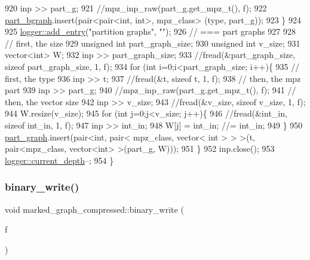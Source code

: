 \begin{DoxyCode}
920     inp >> part\_g;
921     \textcolor{comment}{//mpz\_inp\_raw(part\_g.get\_mpz\_t(), f);}
922     \hyperlink{classmarked__graph__compressed_a7b3267063fba30b45eb21b3ba4e07536}{part\_bgraph}.insert(pair<pair<int, int>, mpz\_class> (type, part\_g));
923   \}
924 
925   \hyperlink{classlogger_a710163deb17bc81f70d53d285b8ac9ac}{logger::add\_entry}(\textcolor{stringliteral}{"partition graphs"}, \textcolor{stringliteral}{""});
926   \textcolor{comment}{// === part graphs}
927 
928   \textcolor{comment}{// first, the size}
929   \textcolor{keywordtype}{unsigned} \textcolor{keywordtype}{int} part\_graph\_size;
930   \textcolor{keywordtype}{unsigned} \textcolor{keywordtype}{int} v\_size;
931   vector<int> W; 
932   inp >> part\_graph\_size;
933   \textcolor{comment}{//fread(&part\_graph\_size, sizeof part\_graph\_size, 1, f);}
934   \textcolor{keywordflow}{for} (\textcolor{keywordtype}{int} i=0;i<part\_graph\_size; i++)\{
935     \textcolor{comment}{// first, the type}
936     inp >> t; 
937     \textcolor{comment}{//fread(&t, sizeof t, 1, f);}
938     \textcolor{comment}{// then, the mpz part}
939     inp >> part\_g;
940     \textcolor{comment}{//mpz\_inp\_raw(part\_g.get\_mpz\_t(), f);}
941     \textcolor{comment}{// then, the vector size}
942     inp >> v\_size;
943     \textcolor{comment}{//fread(&v\_size, sizeof v\_size, 1, f);}
944     W.resize(v\_size);
945     \textcolor{keywordflow}{for} (\textcolor{keywordtype}{int} j=0;j<v\_size; j++)\{
946       \textcolor{comment}{//fread(&int\_in, sizeof int\_in, 1, f);}
947       inp >> int\_in;
948       W[j] = int\_in; \textcolor{comment}{//= int\_in;}
949     \}
950     \hyperlink{classmarked__graph__compressed_ae179a4737e6eab905c18a94d44ef64b7}{part\_graph}.insert(pair<\textcolor{keywordtype}{int}, pair< mpz\_class, vector< int > > >(t, pair<mpz\_class, vector<int>
       >(part\_g, W)));
951   \}
952   inp.close();
953   \hyperlink{classlogger_a9d29b49bd318a719a8e85b59eac54fe0}{logger::current\_depth}--;
954 \}
\end{DoxyCode}
\mbox{\label{classmarked__graph__compressed_ab9cdb7fc43badd58fb5202f74ffac723}} 
\subsubsection{\texorpdfstring{binary\+\_\+write()}{binary\_write()}\hspace{0.1cm}{\footnotesize\ttfamily [1/2]}}
{\footnotesize\ttfamily void marked\+\_\+graph\+\_\+compressed\+::binary\+\_\+write (\begin{DoxyParamCaption}\item[{F\+I\+LE $\ast$}]{f }\end{DoxyParamCaption})}



